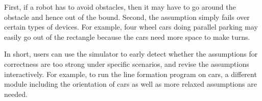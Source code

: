 
First, if a robot has to avoid obstacles,
then it may have to go around the obstacle and hence out of the bound.
Second,  the assumption simply fails over certain types of devices.
For example, four wheel cars doing parallel parking may easily go out of the rectangle
because the cars need more space to make turns.

In short, users can use the simulator to early detect whether
the assumptions for correctness are too strong under specific scenarios,
and revise the assumptions interactively.
For example, to run the line formation program on cars,
a different module including the orientation of cars as well as more relaxed assumptions are needed.
